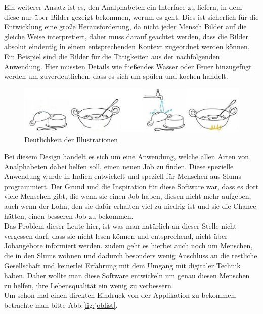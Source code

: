 Ein weiterer Ansatz ist es, den Analphabeten ein Interface zu liefern, in dem diese nur über Bilder gezeigt bekommen, worum es geht. Dies ist sicherlich für die Entwicklung eine große Herausforderung, da nicht jeder Mensch Bilder auf die gleiche Weise interpretiert, daher muss darauf geachtet werden, dass die Bilder absolut eindeutig in einem entsprechenden Kontext zugeordnet werden können. Ein Beispiel sind die Bilder für die Tätigkeiten aus der nachfolgenden Anwendung. Hier mussten Details wie fließendes Wasser oder Feuer hinzugefügt werden um zuverdeutlichen, dass es sich um spülen und kochen handelt.

\begin{figure}[h]
	\centering
		\includegraphics[width=1.00\textwidth]{Daten/pic_fail2.PNG}
	\caption{Deutlichkeit der Illustrationen}
	\label{fig:picfail}
\end{figure}

Bei diesem Design handelt es sich um eine Anwendung, welche allen Arten von Analphabeten dabei helfen soll, einen neuen Job zu finden. Diese spezielle Anwendung wurde in Indien entwickelt und speziell für Menschen aus Slums programmiert. Der Grund und die Inspiration für diese Software war, dass es dort viele Menschen gibt, die wenn sie einen Job haben, diesen nicht mehr aufgeben, auch wenn der Lohn, den sie dafür erhalten viel zu niedrig ist und sie die Chance hätten, einen besseren Job zu bekommen.\\
Das Problem dieser Leute hier, ist was man natürlich an dieser Stelle nicht vergessen darf, dass sie nicht lesen können und entsprechend, nicht über Jobangebote informiert werden. zudem geht es hierbei auch noch um Menschen, die in den Slums wohnen und dadurch besonders wenig Anschluss an die restliche Gesellschaft und keinerlei Erfahrung mit dem Umgang mit digitaler Technik haben. Daher wollte man diese Software entwickeln um genau diesen Menschen zu helfen, ihre Lebensqualität ein wenig zu verbessern.\\
Um schon mal einen direkten Eindruck von der Applikation zu bekommen, betrachte man bitte Abb.\ref{fig:joblist}.


